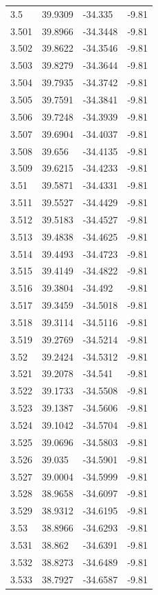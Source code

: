 \begin{tabular}{llll}
3.5 & 39.9309 & -34.335 & -9.81 \\
3.501 & 39.8966 & -34.3448 & -9.81 \\
3.502 & 39.8622 & -34.3546 & -9.81 \\
3.503 & 39.8279 & -34.3644 & -9.81 \\
3.504 & 39.7935 & -34.3742 & -9.81 \\
3.505 & 39.7591 & -34.3841 & -9.81 \\
3.506 & 39.7248 & -34.3939 & -9.81 \\
3.507 & 39.6904 & -34.4037 & -9.81 \\
3.508 & 39.656 & -34.4135 & -9.81 \\
3.509 & 39.6215 & -34.4233 & -9.81 \\
3.51 & 39.5871 & -34.4331 & -9.81 \\
3.511 & 39.5527 & -34.4429 & -9.81 \\
3.512 & 39.5183 & -34.4527 & -9.81 \\
3.513 & 39.4838 & -34.4625 & -9.81 \\
3.514 & 39.4493 & -34.4723 & -9.81 \\
3.515 & 39.4149 & -34.4822 & -9.81 \\
3.516 & 39.3804 & -34.492 & -9.81 \\
3.517 & 39.3459 & -34.5018 & -9.81 \\
3.518 & 39.3114 & -34.5116 & -9.81 \\
3.519 & 39.2769 & -34.5214 & -9.81 \\
3.52 & 39.2424 & -34.5312 & -9.81 \\
3.521 & 39.2078 & -34.541 & -9.81 \\
3.522 & 39.1733 & -34.5508 & -9.81 \\
3.523 & 39.1387 & -34.5606 & -9.81 \\
3.524 & 39.1042 & -34.5704 & -9.81 \\
3.525 & 39.0696 & -34.5803 & -9.81 \\
3.526 & 39.035 & -34.5901 & -9.81 \\
3.527 & 39.0004 & -34.5999 & -9.81 \\
3.528 & 38.9658 & -34.6097 & -9.81 \\
3.529 & 38.9312 & -34.6195 & -9.81 \\
3.53 & 38.8966 & -34.6293 & -9.81 \\
3.531 & 38.862 & -34.6391 & -9.81 \\
3.532 & 38.8273 & -34.6489 & -9.81 \\
3.533 & 38.7927 & -34.6587 & -9.81 \\

\end{tabular}
